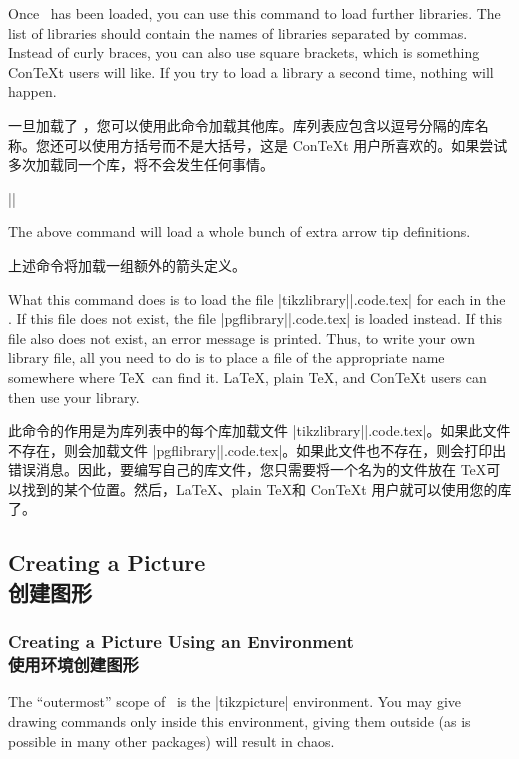 \begin{command}{\usetikzlibrary{}}
  Once \tikzname\ has been loaded, you can use this command to load further
  libraries. The list of libraries should contain the names of libraries
  separated by commas. Instead of curly braces, you can also use square
  brackets, which is something Con\TeX t users will like. If you try to load
  a library a second time, nothing will happen.

  一旦加载了 \tikzname ，您可以使用此命令加载其他库。库列表应包含以逗号分隔的库名称。您还可以使用方括号而不是大括号，这是 Con\TeX t 用户所喜欢的。如果尝试多次加载同一个库，将不会发生任何事情。

  \example |\usetikzlibrary{arrows.meta}|

  The above command will load a whole bunch of extra arrow tip definitions.

  上述命令将加载一组额外的箭头定义。

  What this command does is to load the file
  |tikzlibrary||.code.tex| for each  in the
  . If this file does not exist, the file
  |pgflibrary||.code.tex| is loaded instead. If this file also
  does not exist, an error message is printed. Thus, to write your own
  library file, all you need to do is to place a file of the appropriate name
  somewhere where \TeX\ can find it. \LaTeX, plain \TeX, and Con\TeX t users
  can then use your library.

  此命令的作用是为库列表中的每个库加载文件 |tikzlibrary||.code.tex|。如果此文件不存在，则会加载文件 |pgflibrary||.code.tex|。如果此文件也不存在，则会打印出错误消息。因此，要编写自己的库文件，您只需要将一个名为的文件放在 \TeX 可以找到的某个位置。然后，\LaTeX、plain \TeX 和 Con\TeX t 用户就可以使用您的库了。
\end{command}


\subsection{Creating a Picture\\创建图形}

\subsubsection{Creating a Picture Using an Environment\\使用环境创建图形}

The ``outermost'' scope of \tikzname\ is the |{tikzpicture}| environment. You
may give drawing commands only inside this environment, giving them outside (as
is possible in many other packages) will result in chaos.

